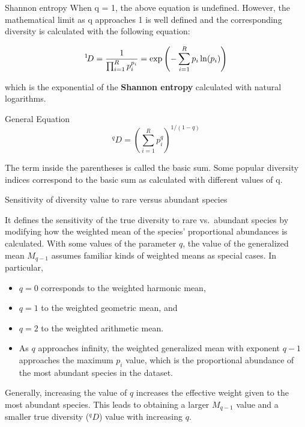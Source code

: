 \documentclass[
  ignorenonframetext,
  aspectratio=169]{beamer}
\providecommand{\tightlist}{%
  \setlength{\itemsep}{0pt}\setlength{\parskip}{0pt}}
\begin{document}
\begin{frame}{Shannon entropy}
\protect\hypertarget{shannon-entropy}{}
When q = 1, the above equation is undefined. However, the mathematical
limit as q approaches 1 is well defined and the corresponding diversity
is calculated with the following equation:

\[
{}^{1}\!D={1 \over {\prod _{i=1}^{R}p_{i}^{p_{i}}}}=\exp \left(-\sum _{i=1}^{R}p_{i}\ln(p_{i})\right)
\]

which is the exponential of the \textbf{Shannon entropy} calculated with
natural logarithms.
\end{frame}

\begin{frame}{General Equation}
\protect\hypertarget{general-equation}{}
\[
{}^{q}\!D=\left({\sum _{i=1}^{R}p_{i}^{q}}\right)^{1/(1-q)}
\]

The term inside the parentheses is called the basic sum. Some popular
diversity indices correspond to the basic sum as calculated with
different values of q.
\end{frame}

\begin{frame}{Sensitivity of diversity value to rare versus abundant
species}
\protect\hypertarget{sensitivity-of-diversity-value-to-rare-versus-abundant-species}{}
\footnotesize

It defines the sensitivity of the true diversity to rare vs.~abundant
species by modifying how the weighted mean of the species' proportional
abundances is calculated. With some values of the parameter \(q\), the
value of the generalized mean \(M_{q-1}\) assumes familiar kinds of
weighted means as special cases. In particular,

\begin{itemize}
\tightlist
\item
  \(q = 0\) corresponds to the weighted harmonic mean,
\item
  \(q = 1\) to the weighted geometric mean, and
\item
  \(q = 2\) to the weighted arithmetic mean.
\item
  As \(q\) approaches infinity, the weighted generalized mean with
  exponent \(q-1\) approaches the maximum \(p_i\) value, which is the
  proportional abundance of the most abundant species in the dataset.
\end{itemize}

Generally, increasing the value of \(q\) increases the effective weight
given to the most abundant species. This leads to obtaining a larger
\(M_{q-1}\) value and a smaller true diversity (\({}^q D\)) value with
increasing \(q\).
\end{frame}
\end{document}
